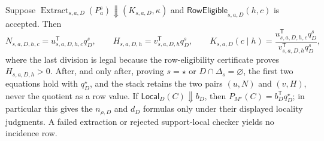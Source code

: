 Suppose \(\operatorname{Extract}_{s,a,D}(P_a^s)\Downarrow(K_{s,a,D},\kappa)\) and \(\mathsf{RowEligible}_{s,a,D}(h,c)\) is accepted.  Then
\[
N_{s,a,D,h,c}=u_{s,a,D,h,c}^{\mathsf T}q_D^s,
\qquad
H_{s,a,D,h}=v_{s,a,D,h}^{\mathsf T}q_D^s,
\qquad
K_{s,a,D}(c\mid h)=
\frac{u_{s,a,D,h,c}^{\mathsf T}q_D^s}
{v_{s,a,D,h}^{\mathsf T}q_D^s},
\]
where the last division is legal because the row-eligibility certificate proves \(H_{s,a,D,h}>0\).  After, and only after, proving \(s=\star\) or \(D\cap\Delta_s=\varnothing\), the first two equations hold with \(q_D^\star\), and the stack retains the two pairs \((u,N)\) and \((v,H)\), never the quotient as a row value.  If \(\mathsf{Local}_D(C)\Downarrow b_D\), then \(P_{M^\star}(C)=b_D^{\mathsf T}q_D^\star\); in particular this gives the \(n_{\rho,D}\) and \(d_D\) formulas only under their displayed locality judgments.  A failed extraction or rejected support-local checker yields no incidence row.